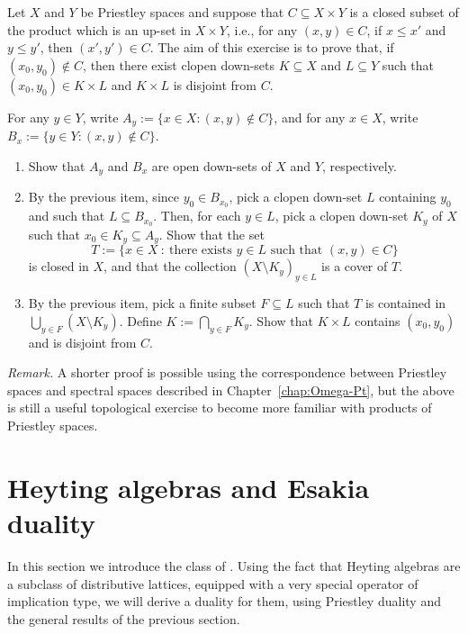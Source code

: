 \begin{exercise}\label{ex:closed-in-product}
Let $X$ and $Y$ be Priestley spaces and suppose that $C \subseteq X \times Y$ is
a closed subset of the product which is an up-set in $X \times Y$, i.e., for any
$(x, y) \in C$, if $x \leq x'$ and $y \leq y'$, then $(x', y') \in C$. The aim of this exercise is to prove
that, if $(x_0,y_0) \not\in C$, then there exist clopen down-sets $K\subseteq X$ and 
$L\subseteq Y$ such that $(x_0,y_0) \in K \times L$ and $K \times L$ is
disjoint from $C$.

For any $y \in Y$, write $A_y := \{x \in X : (x, y) \not\in C\}$, and for any $x \in X$, write $B_x := \{y \in Y : (x, y) \not\in C\}$.
\begin{enumerate}
  \item Show that $A_y$ and $B_x$ are open down-sets of $X$ and $Y$, respectively.
  \item By the previous item, since $y_0 \in B_{x_0}$, pick a clopen down-set $L$ containing $y_0$ and such that $L \subseteq B_{x_0}$. Then, for each $y \in L$, pick a clopen down-set $K_y$ of $X$ such that $x_0 \in K_y \subseteq A_y$. Show that the set
  \[ T := \{ x \in X \ \colon \ \text{there exists } y \in L \text{ such that } (x,y) \in C\}\] is closed in $X$, and that the collection $(X \setminus K_y)_{y \in L}$ is a cover of $T$.
  \item By the previous item, pick a finite subset $F \subseteq L$ such that $T$ is contained in $\bigcup_{y \in F} (X \setminus K_y)$. Define $K := \bigcap_{y \in F} K_y$. Show that $K \times L$ contains $(x_0, y_0)$ and is disjoint from $C$.
\end{enumerate}  
{\it Remark.} A shorter proof is possible using the correspondence between Priestley spaces and spectral spaces described in Chapter~\ref{chap:Omega-Pt}, but the above is still a useful topological exercise to become more familiar with products of Priestley spaces.
\end{exercise}

\section{Heyting algebras and Esakia duality}\label{sec:esakia-heyting}
In this section we introduce the class of . Using the fact that Heyting algebras are a subclass of distributive lattices, equipped with a very special operator of implication type, we will derive a duality for them, using Priestley duality and the general results of the previous section.


